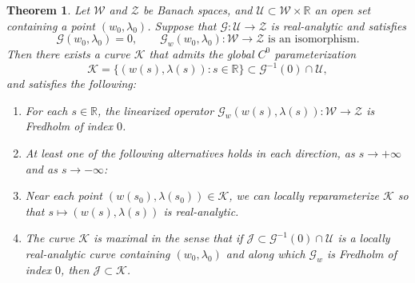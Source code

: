 \documentclass[12pt,letterpaper]{amsart}
\newtheorem{theorem}{Theorem}[section]
\numberwithin{equation}{section}
\begin{document}
\begin{theorem}\label{thm:maximal curve}
Let \(\mathcal{W}\) and \(\mathcal{Z}\) be Banach spaces, and \(\mathcal{U} \subset \mathcal{W} \times \mathbb{R}\) an open set containing a point \((w_0, \lambda_0)\). Suppose that \(\mathcal{G}: \mathcal{U} \to \mathcal{Z}\) is real-analytic and satisfies
\[
\mathcal{G}(w_0, \lambda_0) = 0, \qquad
\mathcal{G}_w(w_0, \lambda_0): \mathcal{W} \to \mathcal{Z} \text{ is an isomorphism.} \tag{B.1}
\]
Then there exists a curve \(\mathcal{K}\) that admits the global \(C^0\) parameterization
\[
\mathcal{K} = \{ (w(s), \lambda(s)) : s \in \mathbb{R} \} \subset \mathcal{G}^{-1}(0) \cap \mathcal{U},
\]
and satisfies the following:
\begin{enumerate}
	\item[(a)] {For each $s\in\mathbb R$, the linearized operator} \(\mathcal{G}_w(w(s), \lambda(s)): \mathcal{W} \to \mathcal{Z}\) is Fredholm of index \(0\).
	\item[(b)] {At least one of the following alternatives holds in each direction, as $s\to+\infty$ and as $s\to-\infty$:}
	\item[(c)] Near each point \((w(s_0), \lambda(s_0)) \in \mathcal{K}\), we can locally reparameterize \(\mathcal{K}\) so that \(s \mapsto (w(s), \lambda(s))\) is real-analytic.
	\item[(d)] The curve \(\mathcal{K}\) is maximal in the sense that if \(\mathcal{J} \subset \mathcal{G}^{-1}(0) \cap \mathcal{U}\) is a locally real-analytic curve containing \((w_0, \lambda_0)\) and along which \(\mathcal{G}_w\) is Fredholm of index \(0\), then \(\mathcal{J} \subset \mathcal{K}\).
	\end{enumerate}
\end{theorem}
\end{document}
